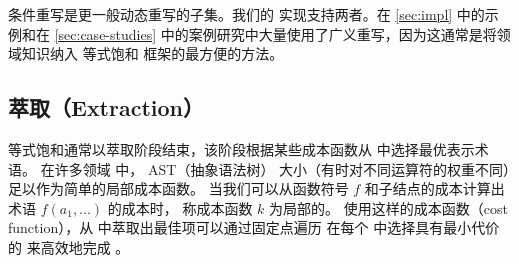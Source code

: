 条件重写是更一般动态重写的子集。我们的 \egg 实现支持两者。在 \autoref{sec:impl} 中的示例和在 \autoref{sec:case-studies} 中的案例研究中大量使用了广义重写，因为这通常是将领域知识纳入 等式饱和 框架的最方便的方法。

\subsection{萃取（Extraction）}
\label{sec:tricks-extraction}


等式饱和通常以萃取阶段结束，该阶段根据某些成本函数从 \eclass 中选择最优表示术语。
在许多领域 \cite{herbie, szalinski} 中，
  AST（抽象语法树） 大小（有时对不同运算符的权重不同）足以作为简单的局部成本函数。 
当我们可以从函数符号 $f$ 和子结点的成本计算出术语 $f(a_{1}, ...)$ 的成本时，
  称成本函数 $k$ 为局部的。
使用这样的成本函数（cost function），从 \egraph 中萃取出最佳项可以通过固定点遍历 \egraph 在每个 \eclass 中选择具有最小代价的 \enode 来高效地完成 \cite{herbie}。

